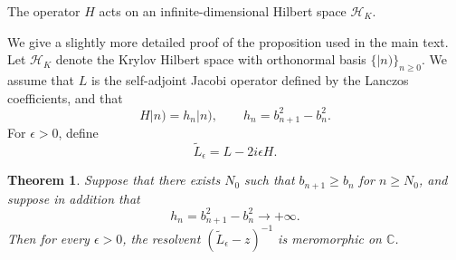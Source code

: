 \documentclass[JHEP,12pt]{article}
\newtheorem{theorem}[lemma]{Theorem}
\begin{document}
The operator $H$ acts on an infinite-dimensional Hilbert space $\mathcal{H}_K$.


We give a slightly more detailed proof of the proposition used in the main text.
Let \(\mathcal H_K\) denote the Krylov Hilbert space with orthonormal basis
\(\{|n)\}_{n\ge 0}\). We assume that \(L\) is the self-adjoint Jacobi operator
defined by the Lanczos coefficients, and that
\[
H|n)=h_n|n),
\qquad
h_n=b_{n+1}^2-b_n^2 .
\]
For \(\epsilon>0\), define
\[
\widetilde L_\epsilon=L-2i\epsilon H .
\]

\begin{theorem}
Suppose that there exists \(N_0\) such that \(b_{n+1}\ge b_n\) for
\(n\ge N_0\), and suppose in addition that
\[
h_n=b_{n+1}^2-b_n^2\longrightarrow +\infty .
\]
Then for every \(\epsilon>0\), the resolvent
$(\widetilde L_\epsilon-z)^{-1}$
is meromorphic on \(\mathbb C\).
\end{theorem}
\end{document}
